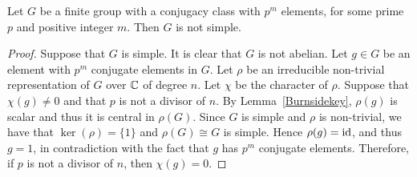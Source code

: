 \begin{theorem}[Burnside]\label{Burnside}
Let $G$ be a finite group with a conjugacy class with $p^m$ elements, for some prime $p$ and positive integer $m$. 
Then $G$ is not simple.
\end{theorem}

\begin{proof}
    Suppose that $G$ is simple. It is clear that $G$ is not abelian. Let $g\in G$ be an element with $p^m$ conjugate elements in $G$.
    Let $\rho$ be an irreducible non-trivial representation of $G$ over $\mathbb{C}$ of degree $n$. Let $\chi$ be the character of $\rho$.
    Suppose that $\chi(g)\neq 0$ and that $p$ is not a divisor of $n$. By Lemma~\ref{Burnsidekey}, $\rho(g)$ is scalar and thus it is central in $\rho(G)$. Since $G$ is simple and $\rho$ is non-trivial, we have that $\ker(\rho)=\{ 1\}$ and $\rho(G)\cong G$ is simple.
    Hence $\rho(g)=\operatorname{id}$, and thus $g=1$, in contradiction with the fact that $g$ has $p^m$ conjugate elements. Therefore, if $p$ is not a divisor of $n$, then $\chi(g)=0$.
    

\end{proof}
